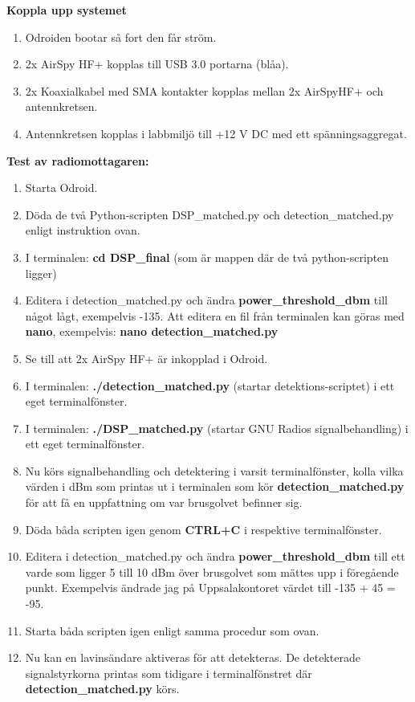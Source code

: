 \documentclass[11pt, a4paper]{report}
\begin{document}
\textbf{Koppla upp systemet}
\begin{enumerate}
    \item Odroiden bootar så fort den får ström.
    \item 2x AirSpy HF+ kopplas till USB 3.0 portarna (blåa).
    \item 2x Koaxialkabel med SMA kontakter kopplas mellan 2x AirSpyHF+ och antennkretsen.
    \item Antennkretsen kopplas i labbmiljö till +12 V DC med ett spänningsaggregat.
\end{enumerate}
\newpage
\textbf{Test av radiomottagaren:}
\begin{enumerate}
    \item Starta Odroid.
    \item Döda de två Python-scripten DSP\_matched.py och detection\_matched.py enligt instruktion ovan.
    \item I terminalen: \textbf{cd DSP\_final} (som är mappen där de två python-scripten ligger)
    \item Editera i detection\_matched.py och ändra \textbf{power\_threshold\_dbm} till något lågt, exempelvis -135. Att editera en fil från terminalen kan göras med \textbf{nano}, exempelvis: \textbf{nano detection\_matched.py}
    \item Se till att 2x AirSpy HF+ är inkopplad i Odroid.
    \item I terminalen: \textbf{./detection\_matched.py} (startar detektions-scriptet) i ett eget terminalfönster.
    \item I terminalen: \textbf{./DSP\_matched.py} (startar GNU Radios signalbehandling) i ett eget terminalfönster.
    \item Nu körs signalbehandling och detektering i varsit terminalfönster, kolla vilka värden i dBm som printas ut i terminalen som kör \textbf{detection\_matched.py} för att få en uppfattning om var brusgolvet befinner sig.
    \item Döda båda scripten igen genom \textbf{CTRL+C} i respektive terminalfönster.
    \item Editera i detection\_matched.py och ändra \textbf{power\_threshold\_dbm} till ett varde som ligger 5 till 10 dBm över brusgolvet som mättes upp i föregående punkt. Exempelvis ändrade jag på Uppsalakontoret värdet till -135 + 45 = -95.
    \item Starta båda scripten igen enligt samma procedur som ovan. 
    \item Nu kan en lavinsändare aktiveras för att detekteras. De detekterade signalstyrkorna printas som tidigare i terminalfönstret där \textbf{detection\_matched.py} körs.
\end{enumerate}
\end{document}
